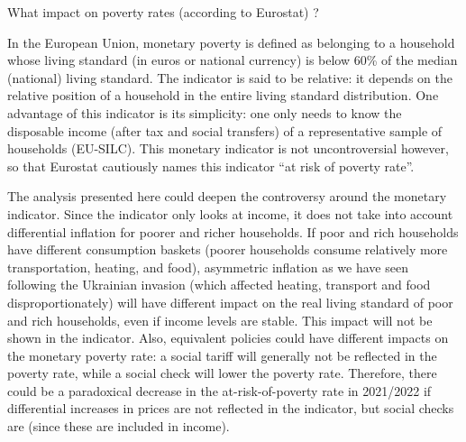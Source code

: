 \documentclass[
  9pt,
  a4paper,
  numbers=noendperiod,
  DIV=12]{scrartcl}
\begin{document}
\FloatBarrier

\begin{tcolorbox}[enhanced jigsaw, leftrule=.75mm, rightrule=.15mm, breakable, opacityback=0, toprule=.15mm, colback=white, arc=.35mm, left=2mm, colframe=quarto-callout-note-color-frame, bottomrule=.15mm]

What impact on poverty rates (according to Eurostat) ?

In the European Union, monetary poverty is defined as belonging to a
household whose living standard (in euros or national currency) is below
60\% of the median (national) living standard. The indicator is said to
be relative: it depends on the relative position of a household in the
entire living standard distribution. One advantage of this indicator is
its simplicity: one only needs to know the disposable income (after tax
and social transfers) of a representative sample of households
(EU-SILC). This monetary indicator is not uncontroversial however, so
that Eurostat cautiously names this indicator ``at risk of poverty
rate''.

The analysis presented here could deepen the controversy around the
monetary indicator. Since the indicator only looks at income, it does
not take into account differential inflation for poorer and richer
households. If poor and rich households have different consumption
baskets (poorer households consume relatively more transportation,
heating, and food), asymmetric inflation as we have seen following the
Ukrainian invasion (which affected heating, transport and food
disproportionately) will have different impact on the real living
standard of poor and rich households, even if income levels are stable.
This impact will not be shown in the indicator. Also, equivalent
policies could have different impacts on the monetary poverty rate: a
social tariff will generally not be reflected in the poverty rate, while
a social check will lower the poverty rate. Therefore, there could be a
paradoxical decrease in the at-risk-of-poverty rate in 2021/2022 if
differential increases in prices are not reflected in the indicator, but
social checks are (since these are included in income).


\end{tcolorbox}
\end{document}

